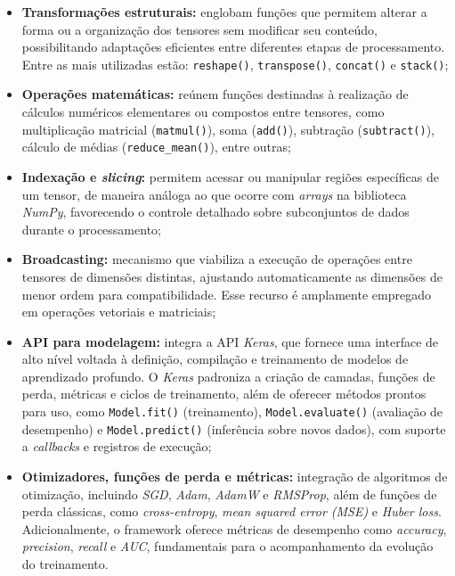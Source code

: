 \begin{itemize}

    \item \textbf{Transformações estruturais:} englobam funções que permitem alterar a forma ou a organização dos tensores sem modificar seu conteúdo, possibilitando adaptações eficientes entre diferentes etapas de processamento. Entre as mais utilizadas estão: \texttt{reshape()}, \texttt{transpose()}, \texttt{concat()} e \texttt{stack()};

    \item \textbf{Operações matemáticas:} reúnem funções destinadas à realização de cálculos numéricos elementares ou compostos entre tensores, como multiplicação matricial (\texttt{matmul()}), soma (\texttt{add()}), subtração (\texttt{subtract()}), cálculo de médias (\texttt{reduce\_mean()}), entre outras;

    \item \textbf{Indexação e \textit{slicing}:} permitem acessar ou manipular regiões específicas de um tensor, de maneira análoga ao que ocorre com \textit{arrays} na biblioteca \textit{NumPy}, favorecendo o controle detalhado sobre subconjuntos de dados durante o processamento;

    \item \textbf{Broadcasting:} mecanismo que viabiliza a execução de operações entre tensores de dimensões distintas, ajustando automaticamente as dimensões de menor ordem para compatibilidade. Esse recurso é amplamente empregado em operações vetoriais e matriciais;

    \item \textbf{API para modelagem:} integra a \acs{API} \textit{Keras}, que fornece uma interface de alto nível voltada à definição, compilação e treinamento de modelos de aprendizado profundo. O \textit{Keras} padroniza a criação de camadas, funções de perda, métricas e ciclos de treinamento, além de oferecer métodos prontos para uso, como \texttt{Model.fit()} (treinamento), \texttt{Model.evaluate()} (avaliação de desempenho) e \texttt{Model.predict()} (inferência sobre novos dados), com suporte a \textit{callbacks} e registros de execução;

    \item \textbf{Otimizadores, funções de perda e métricas:} integração de algoritmos de otimização, incluindo \textit{\acs{SGD}}, \textit{Adam}, \textit{AdamW} e \textit{RMSProp}, além de funções de perda clássicas, como \textit{cross-entropy}, \textit{mean squared error (\acs{MSE})} e \textit{Huber loss}. Adicionalmente, o framework oferece métricas de desempenho como \textit{accuracy}, \textit{precision}, \textit{recall} e \textit{\acs{AUC}}, fundamentais para o acompanhamento da evolução do treinamento.
    

\end{itemize}
